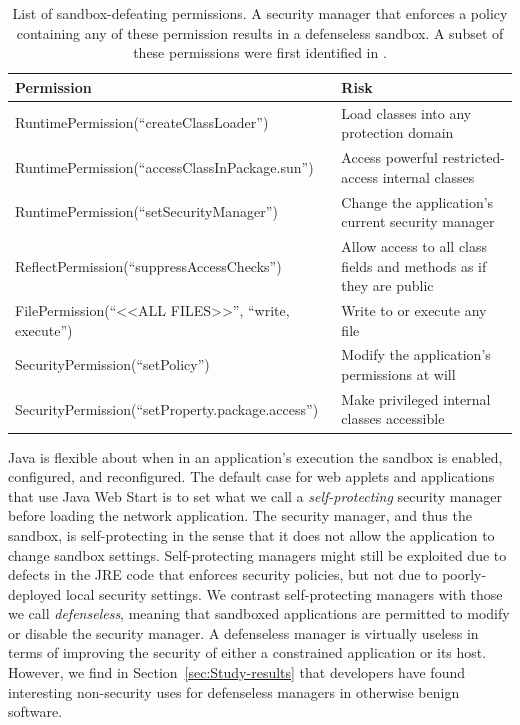 \documentclass{sig-alternate}
\begin{document}
\begin{table}
\caption{List of sandbox-defeating permissions. A security manager that enforces
a policy containing any of these permission results
\label{tab:defenseless-permissions}
in a defenseless sandbox. A subset of these permissions were first identified in \cite{security_explorations_2012}. 
}
\begin{tabular}{ll}
\toprule 
\textbf{Permission} & \textbf{Risk}\tabularnewline
\midrule
RuntimePermission(``createClassLoader'') & Load classes into any protection domain\tabularnewline
RuntimePermission(``accessClassInPackage.sun'') & Access powerful restricted-access internal classes\tabularnewline
RuntimePermission(``setSecurityManager'') & Change the application's current security manager\tabularnewline
ReflectPermission(``suppressAccessChecks'') & Allow access to all class fields and methods as if they are public\tabularnewline
FilePermission(``<\textcompwordmark{}<ALL FILES>\textcompwordmark{}>'',
``write, execute'') & Write to or execute any file\tabularnewline
SecurityPermission(``setPolicy'') & Modify the application's permissions at will\tabularnewline
SecurityPermission(``setProperty.package.access'') & Make privileged internal classes accessible\tabularnewline
\bottomrule
\end{tabular}
\vspace{-0.5cm}
\end{table}

Java is flexible about when in an application's execution the sandbox
is enabled, configured, and reconfigured. The default case for web applets and applications
that use Java Web Start is to set what we call a \textit{self-protecting} security
manager before loading the network application. The security
manager, and thus the sandbox, is self-protecting in the sense that
it does not allow the application to change sandbox settings. Self-protecting managers might
still be exploited due to defects in the JRE code that enforces security
policies, but not due to poorly-deployed local security settings. We contrast
self-protecting managers with those we call 
\textit{defenseless}, meaning that sandboxed applications are 
permitted to modify or disable the security manager.  
A defenseless manager is virtually useless in terms of improving the
security of either a constrained application or its host. However, we find
in Section~\ref{sec:Study-results} that developers
have found interesting non-security uses for defenseless managers in otherwise
benign software.
\end{document}
